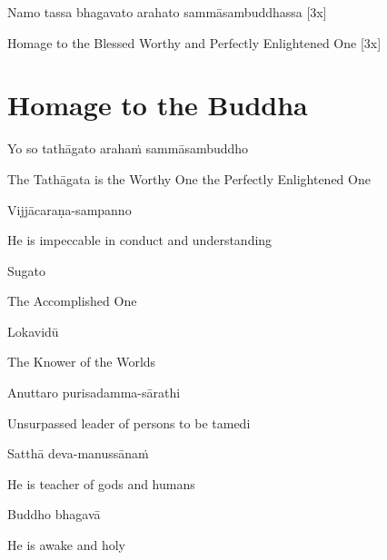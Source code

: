 Namo tassa bhagavato arahato sammāsambuddhassa [3x]

\begin{cprenglish}
Homage to the Blessed Worthy and Perfectly Enlightened One [3x]
\end{cprenglish}

\clearpage

\section*{Homage to the Buddha}

\begin{leader}
\end{leader}
\begin{leader}
\end{leader}

Yo so tathāgato arahaṁ sammāsambuddho

\begin{cprenglish}
  The Tathāgata is the Worthy One the Perfectly Enlightened One
\end{cprenglish}

Vijjācaraṇa-sampanno

\begin{cprenglish}
He is impeccable in conduct and understanding
\end{cprenglish}

Sugato

\begin{cprenglish}
The Accomplished One
\end{cprenglish}

Lokavidū

\begin{cprenglish}
The Knower of the Worlds
\end{cprenglish}

Anuttaro purisadamma-sārathi

\begin{cprenglish}
Unsurpassed leader of persons to be tamedi
\end{cprenglish}

Satthā deva-manussānaṁ

\begin{cprenglish}
He is teacher of gods and humans
\end{cprenglish}

Buddho bhagavā

\begin{cprenglish}
He is awake and holy
\end{cprenglish}

